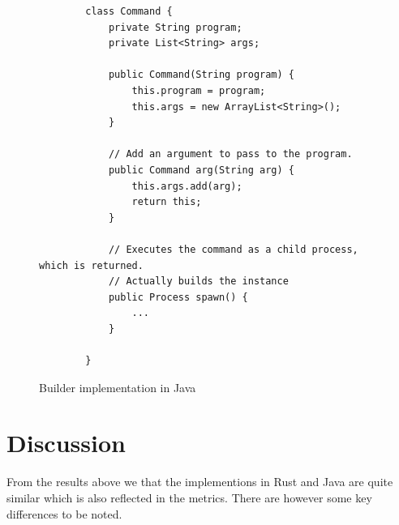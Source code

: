 \documentclass[conference]{IEEEtran}
\begin{document}
\begin{figure}[btp]
    \begin{verbatim}
        class Command {
            private String program;
            private List<String> args;

            public Command(String program) {
                this.program = program;
                this.args = new ArrayList<String>();
            }

            // Add an argument to pass to the program.
            public Command arg(String arg) {
                this.args.add(arg);
                return this;
            }

            // Executes the command as a child process, which is returned.
            // Actually builds the instance
            public Process spawn() {
                ...
            }

        }
    \end{verbatim}
    \caption{Builder implementation in Java}
    \label{fig:builder-java-impl}
\end{figure}

\section{Discussion}


From the results above we that the implementions in Rust and Java are quite similar which is also reflected in the metrics. 
There are however some key differences to be noted.
\end{document}
